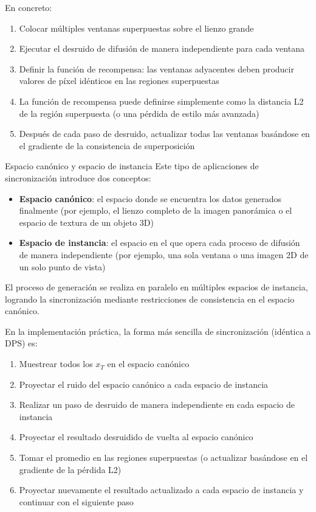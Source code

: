 En concreto:
\begin{enumerate}
    \item Colocar múltiples ventanas superpuestas sobre el lienzo grande
    \item Ejecutar el desruido de difusión de manera independiente para cada ventana
    \item Definir la función de recompensa: las ventanas adyacentes deben producir valores de píxel idénticos en las regiones superpuestas
    \item La función de recompensa puede definirse simplemente como la distancia L2 de la región superpuesta (o una pérdida de estilo más avanzada)
    \item Después de cada paso de desruido, actualizar todas las ventanas basándose en el gradiente de la consistencia de superposición
\end{enumerate}

\begin{importantbox}{Espacio canónico y espacio de instancia}
Este tipo de aplicaciones de sincronización introduce dos conceptos:
\begin{itemize}
    \item \textbf{Espacio canónico}: el espacio donde se encuentra los datos generados finalmente (por ejemplo, el lienzo completo de la imagen panorámica o el espacio de textura de un objeto 3D)
    \item \textbf{Espacio de instancia}: el espacio en el que opera cada proceso de difusión de manera independiente (por ejemplo, una sola ventana o una imagen 2D de un solo punto de vista)
\end{itemize}
El proceso de generación se realiza en paralelo en múltiples espacios de instancia, logrando la sincronización mediante restricciones de consistencia en el espacio canónico.
\end{importantbox}

En la implementación práctica, la forma más sencilla de sincronización (idéntica a DPS) es:

\begin{enumerate}
    \item Muestrear todos los $x_T$ en el espacio canónico
    \item Proyectar el ruido del espacio canónico a cada espacio de instancia
    \item Realizar un paso de desruido de manera independiente en cada espacio de instancia
    \item Proyectar el resultado desruidido de vuelta al espacio canónico
    \item Tomar el promedio en las regiones superpuestas (o actualizar basándose en el gradiente de la pérdida L2)
    \item Proyectar nuevamente el resultado actualizado a cada espacio de instancia y continuar con el siguiente paso
\end{enumerate}

